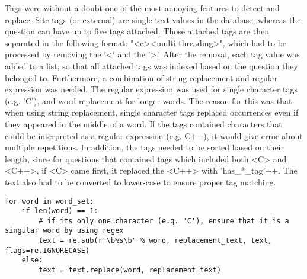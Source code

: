 \vspace{0.5em}\newline
Tags were without a doubt one of the most annoying features to detect and replace. 
Site tags (or external) are single text values in the database, whereas the question can have up to five tags attached. 
Those attached tags are then separated in the following format: "<c><multi-threading>", which had to be processed by removing the '<' and the '>'.
After the removal, each tag value was added to a list, so that all attached tags was indexed based on the question they belonged to. 
Furthermore, a combination of string replacement and regular expression was needed. 
The regular expression was used for single character tags (e.g. 'C'), and word replacement for longer words.
The reason for this was that when using string replacement, single character tags replaced occurrences even if they appeared in the middle of a word.
If the tags contained characters that could be interpreted as a regular expression (e.g. C++), it would give error about multiple repetitions.
In addition, the tags needed to be sorted based on their length, since for questions that contained tags which included both <C> and <C++>, 
if <C> came first, it replaced the <C++> with 'has\_*\_tag'++. The text also had to be converted to lower-case to ensure proper tag matching. 

\begin{lstlisting}[caption={Replacing tags in the question}, 
label={lst:pandas_categorical}, basicstyle=\small] 
for word in word_set:
	if len(word) == 1:
		# if its only one character (e.g. 'C'), ensure that it is a singular word by using regex
		text = re.sub(r"\b%s\b" % word, replacement_text, text, flags=re.IGNORECASE)
	else:
		text = text.replace(word, replacement_text)
\end{lstlisting}
